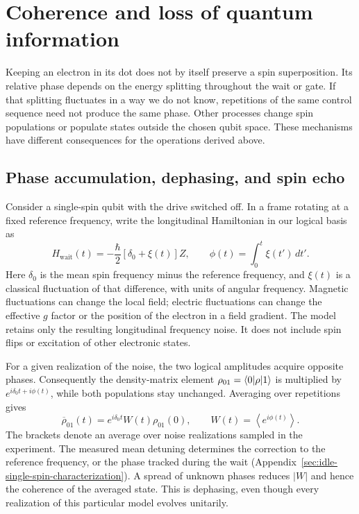 \section{Coherence and loss of quantum information}
\label{sec:platform-coherence}

Keeping an electron in its dot does not by itself preserve a spin
superposition. Its relative phase depends on the energy splitting
throughout the wait or gate. If that splitting fluctuates in a way
we do not know, repetitions of the same control sequence need not
produce the same phase. Other processes change spin populations or
populate states outside the chosen qubit space. These mechanisms
have different consequences for the operations derived above.

\subsection{Phase accumulation, dephasing, and spin echo}

Consider a single-spin qubit with the drive switched off. In a frame
rotating at a fixed reference frequency, write the longitudinal
Hamiltonian in our logical basis as
\begin{equation}
 H_{\mathrm{wait}}(t)=-\frac{\hbar}{2}
                 [\delta_0+\xi(t)]Z,
 \qquad
 \phi(t)=\int_0^t\xi(t')\,dt'.
 \label{eq:platform-wait-noise}
\end{equation}
Here $\delta_0$ is the mean spin frequency minus the reference
frequency, and $\xi(t)$ is a classical fluctuation of that difference,
with units of angular frequency. Magnetic fluctuations can change
the local field; electric fluctuations can change the effective
$g$ factor or the position of the electron in a field gradient.
The model retains only the resulting longitudinal frequency noise.
It does not include spin flips or excitation of other electronic
states.

For a given realization of the noise, the two logical amplitudes
acquire opposite phases. Consequently the density-matrix element
$\rho_{01}=\langle 0\rvert\rho\lvert 1\rangle$ is multiplied by
$e^{i\delta_0t+i\phi(t)}$, while both populations stay unchanged.
Averaging over repetitions gives
\begin{equation}
 \overline{\rho}_{01}(t)
       =e^{i\delta_0t}W(t)\rho_{01}(0),
 \qquad W(t)=\left\langle e^{i\phi(t)}\right\rangle.
 \label{eq:platform-phase-coherence}
\end{equation}
The brackets denote an average over noise realizations sampled in
the experiment. The measured mean detuning determines the correction
to the reference frequency, or the phase tracked during the wait
(Appendix~\ref{sec:idle-single-spin-characterization}).
A spread of unknown phases reduces $|W|$ and
hence the coherence of the averaged state. This is dephasing, even
though every realization of this particular model evolves unitarily.

